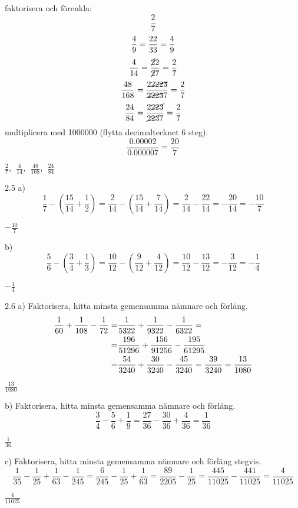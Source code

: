\pagebreak
\begin{task}{2.4}
	faktorisera och förenkla:
	\[\dfrac{2}{7}\]
	\[\dfrac{4}{9}=\dfrac{2\*2}{3\*3}=\dfrac{4}{9}\]
	\[\dfrac{4}{14}=\dfrac{\cancel{2}\*2}{\cancel{2}\*7}=\dfrac{2}{7}\]
	\[\dfrac{48}{168}=\dfrac{2\*\cancel{2\*2\*2\*3}}{\cancel{2\*2\*2\*3}\*7}=\dfrac{2}{7}\]
	\[\dfrac{24}{84}=\dfrac{2\*\cancel{2\*2\*3}}{\cancel{2\*2\*3}\*7}=\dfrac{2}{7}\]
	multiplicera med 1000000 (flytta decimaltecknet 6 steg):
	\[\dfrac{0.00002}{0.000007}=\dfrac{20}{7}\]
	
	\ans $\frac{2}{7},~~ \frac{4}{14},~~ \frac{48}{168},~~ \frac{24}{84}$
\end{task}

\begin{task}{2.5 a)}
	\[\frac{1}{7}-\left(\frac{15}{14}+\frac{1}{2}\right)=\frac{2}{14}-\left(\frac{15}{14}+\frac{7}{14}\right)=\frac{2}{14}-\frac{22}{14}=-\frac{20}{14}=-\frac{10}{7}\]
	
	\ans $-\frac{10}{7}$
\end{task}

\begin{task}{b)}
	\[\frac{5}{6}-\left(\frac{3}{4}+\frac{1}{3}\right)=\frac{10}{12}-\left(\frac{9}{12}+\frac{4}{12}\right)=\frac{10}{12}-\frac{13}{12}=-\frac{3}{12}=-\frac{1}{4}\]
	
	\ans $-\frac{1}{4}$
\end{task}

\begin{task}{2.6 a)}
	Faktorisera, hitta minsta gemensamma nämnare och förläng.
	\begin{align*}
	\frac{1}{60}+\frac{1}{108}-\frac{1}{72}=&
	\frac{1}{5\*3\*2\*2}+\frac{1}{9\*3\*2\*2}-\frac{1}{6\*3\*2\*2}= \\ =
	&\frac{1\*9\*6}{5\*12\*9\*6}+\frac{1\*5\*6}{9\*12\*5\*6}-\frac{1\*9\*5}{6\*12\*9\*5} \\ =
	&\frac{54}{3240}+\frac{30}{3240}-\frac{45}{3240}=\frac{39}{3240}=\frac{13}{1080}
	\end{align*}
	
	\ans $\frac{13}{1080}$
\end{task}

\begin{task}{b)}
	Faktorisera, hitta minsta gemensamma nämnare och förläng.
	\[\frac{3}{4}-\frac{5}{6}+\frac{1}{9}=\frac{27}{36}-\frac{30}{36}+\frac{4}{36}=\frac{1}{36}\]
	
	\ans $\frac{1}{36}$
\end{task}

\begin{task}{c)}
	Faktorisera, hitta minsta gemensamma nämnare och förläng stegvis.
	\[\frac{1}{35}-\frac{1}{25}+\frac{1}{63}-\frac{1}{245}=
	\frac{6}{245}-\frac{1}{25}+\frac{1}{63}=
	\frac{89}{2205}-\frac{1}{25}=
	\frac{445}{11025}-\frac{441}{11025}=
	\frac{4}{11025}\]
	
	\ans $\frac{4}{11025}$
\end{task}

